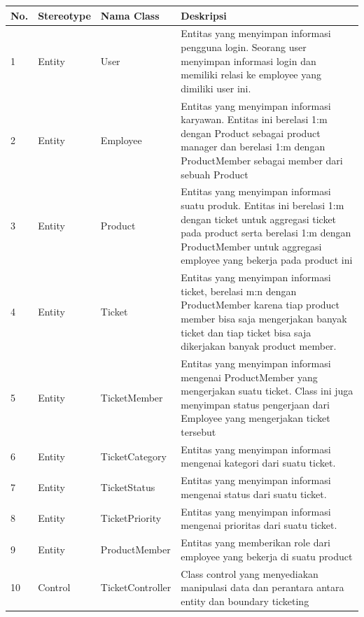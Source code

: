 \documentclass[12pt]{article}
\begin{document}
\begin{enumerate}[label=\textbf{4.\arabic*.}]
\begin{enumerate} [label=\textbf{4.2.\arabic*.}, wide, labelwidth=!, labelindent=0pt]
\begin{enumerate}[label=\textbf{4.3.\arabic*.}]
\begin{longtable}{ |l|l|l|p{}| }
                    \hline
                    \textbf{No.} & \textbf{Stereotype} & \textbf{Nama Class} & \textbf{Deskripsi}\\
                    \hline
                    \endhead
                  
                    1 & Entity & User & Entitas yang menyimpan informasi pengguna login. Seorang user menyimpan informasi login dan memiliki relasi ke employee yang dimiliki user ini.\\
                    \hline
                    2 & Entity & Employee & Entitas yang menyimpan informasi karyawan. Entitas ini berelasi 1:m dengan Product sebagai product manager dan berelasi 1:m dengan ProductMember sebagai member dari sebuah Product \\
                    \hline
                    3 & Entity & Product & Entitas yang menyimpan informasi suatu produk. Entitas ini berelasi 1:m dengan ticket untuk aggregasi ticket pada product serta berelasi 1:m dengan ProductMember untuk aggregasi employee yang bekerja pada product ini \\
                    \hline
                    4 & Entity & Ticket & Entitas yang menyimpan informasi ticket, berelasi m:n dengan ProductMember karena tiap product member bisa saja mengerjakan banyak ticket dan tiap ticket bisa saja dikerjakan banyak product member. \\
                    \hline
                    5 & Entity & TicketMember & Entitas yang menyimpan informasi mengenai ProductMember yang mengerjakan suatu ticket. Class ini juga menyimpan status pengerjaan dari Employee yang mengerjakan ticket tersebut \\
                    \hline
                    6 & Entity & TicketCategory & Entitas yang menyimpan informasi mengenai kategori dari suatu ticket. \\
                    \hline
                    7 & Entity & TicketStatus & Entitas yang menyimpan informasi mengenai status dari suatu ticket. \\
                    \hline
                    8 & Entity & TicketPriority & Entitas yang menyimpan informasi mengenai prioritas dari suatu ticket. \\
                    \hline
                    9 & Entity & ProductMember & Entitas yang memberikan role dari employee yang bekerja di suatu product \\
                    \hline
                    10 & Control & TicketController & Class control yang menyediakan manipulasi data dan perantara antara entity dan boundary ticketing \\

\end{longtable}
\end{enumerate}
\end{enumerate}
\end{enumerate}
\end{document}
